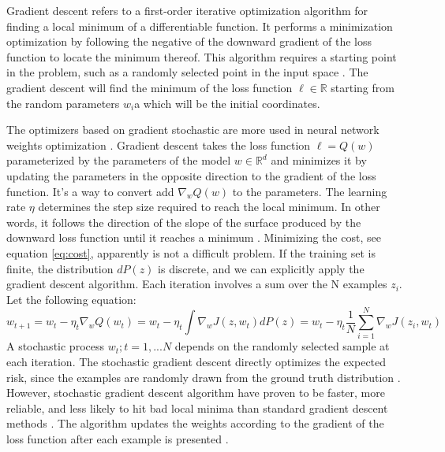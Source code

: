 \documentclass[lnbip]{svmultln}
\begin{document}
	Gradient descent refers to a first-order iterative optimization algorithm for finding a local minimum of a differentiable function. It performs a minimization optimization by following the negative of the downward gradient of the loss function to locate the minimum thereof. This algorithm requires a starting point in the problem, such as a randomly selected point in the input space \cite[]{bottou2012stochastic}.
	The gradient descent will find the minimum of the loss function $\ell \in \mathbb{R}$ starting from the random parameters $w_i$a which will be the initial coordinates.
	
	The optimizers based on gradient stochastic are more used in neural network weights optimization \cite[]{ruder2016overview}.
	Gradient descent takes the loss function $\ell = Q(w)$ parameterized by the parameters of the model $w \in \mathbb{R}^d$ and minimizes it by updating the parameters in the opposite direction to the gradient of the loss function. It's a way to convert add $\nabla_w Q(w)$ to the parameters. The learning rate $\eta$ determines the step size required to reach the local minimum. In other words, it follows the direction of the slope of the surface produced by the downward loss function until it reaches a minimum \cite[]{bottou1991stochastic, ruder2016overview}. Minimizing the cost, see equation \ref{eq:cost}, apparently is not a difficult problem. If the training set is finite, the distribution $dP(z)$ is discrete, and we can explicitly apply the gradient descent algorithm. Each iteration involves a sum over the N examples $z_i$. Let the following equation:
	\begin{equation}
	w_{t+1}   = w_t - \eta_t {\nabla_w Q(w_t)} 
	 = w_t - \eta_t \int \nabla_w J(z,w_t) dP(z) 
	 = w_t - \eta_t \frac{1}{N} \sum_{i=1}^{N}  \nabla_w J(z_i,w_t)	
	\label{eq:descent_gradient}
	\end{equation}
	A stochastic process ${w_t; t=1,...N}$ depends on the randomly selected sample at each iteration.
	The stochastic gradient descent directly optimizes the expected risk, since the examples are randomly drawn from the ground truth distribution \cite[]{bottou2010large, esunge2020superposed}.
	However, stochastic gradient descent algorithm have proven to be faster, more reliable, and less likely to hit bad local minima than standard gradient descent methods \cite[]{wijnhoven2010fast}. The algorithm updates the weights according to the gradient of the loss function after each example is presented \cite[]{bottou1991stochastic}.\\
	
\end{document}
